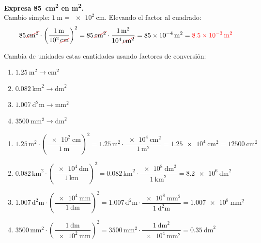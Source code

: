 \begin{example}
    \textbf{Expresa \qty{85}{\square\cm} en \unit{\square\m}.} \\
    Cambio simple: \(\qty{1}{\m} = \qty{e2}{\cm}\). Elevando el factor al cuadrado:
    \begin{equation*}
        \num{85}\,\cancelunit{\square\cm} \cdot \left(\dfrac{\qty{1}{\m}}{\num{e2}\,\cancelunit{\cm}}\right)^{2}
        = \num{85}\,\cancelunit{\square\cm} \cdot \dfrac{\qty{1}{\square\m}}{\num{e4}\,\cancelunit{\square\cm}}
        = \qty{85e-4}{\square\m} = \textcolor{red}{\qty{8.5e-3}{\square\m}}
    \end{equation*}
\end{example}

\begin{exercise}
    Cambia de unidades estas cantidades usando factores de conversión:
    \begin{enumerate}[label=\letraminuscula]
        \item \(\qty{1.25}{\square\m} \to \unit{\square\cm}\)
        \item \(\qty{0.082}{\square\km} \to \unit{\square\dm}\)
        \item \(\qty{1.007}{\square\deca\metre} \to \unit{\square\mm}\)
        \item \(\qty{3500}{\square\mm} \to \unit{\square\dm}\)
    \end{enumerate}
    \begin{solu}
        \begin{enumerate}[label=\alph*)]
            \item \(\num{1.25}\,\unit{\square\m} \cdot \left(\dfrac{\qty{e2}{\cm}}{\qty{1}{\m}}\right)^{2} = \num{1.25}\,\unit{\square\m} \cdot \dfrac{\qty{e4}{\square\cm}}{\qty{1}{\square\m}} = \qty{1.25e4}{\square\cm} = \qty{12500}{\square\cm}\)
            \item \(\num{0.082}\,\unit{\square\km} \cdot \left(\dfrac{\qty{e4}{\dm}}{\qty{1}{\km}}\right)^{2} = \num{0.082}\,\unit{\square\km} \cdot \dfrac{\qty{e8}{\square\dm}}{\qty{1}{\square\km}} = \qty{8.2e6}{\square\dm}\)
            \item \(\num{1.007}\,\unit{\square\deca\m} \cdot \left(\dfrac{\qty{e4}{\mm}}{\qty{1}{\deca\m}}\right)^{2} = \num{1.007}\,\unit{\square\deca\m} \cdot \dfrac{\qty{e8}{\square\mm}}{\qty{1}{\square\deca\m}} = \qty{1.007e8}{\square\mm}\)
            \item \(\num{3500}\,\unit{\square\mm} \cdot \left(\dfrac{\qty{1}{\dm}}{\qty{e2}{\mm}}\right)^{2} = \num{3500}\,\unit{\square\mm} \cdot \dfrac{\qty{1}{\square\dm}}{\qty{e4}{\square\mm}} = \qty{0.35}{\square\dm}\)
        \end{enumerate}
    \end{solu}
\end{exercise}

